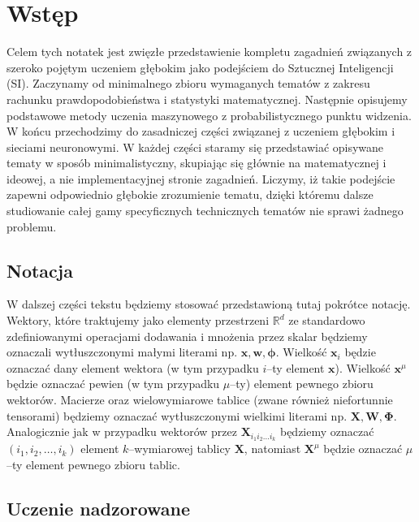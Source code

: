 \documentclass{myclass}
\numberwithin{equation}{section}
\begin{document}
\tableofcontents
\newpage

\section{Wstęp}

Celem tych notatek jest zwięzłe przedstawienie kompletu zagadnień związanych z szeroko pojętym
uczeniem głębokim jako podejściem do Sztucznej Inteligencji (SI). Zaczynamy od minimalnego zbioru
wymaganych tematów z zakresu rachunku prawdopodobieństwa i statystyki matematycznej. Następnie
opisujemy podstawowe metody uczenia maszynowego z probabilistycznego punktu widzenia. W końcu
przechodzimy do zasadniczej części związanej z uczeniem głębokim i sieciami neuronowymi. W każdej
części staramy się przedstawiać opisywane tematy w sposób minimalistyczny, skupiając się głównie na
matematycznej i ideowej, a nie implementacyjnej stronie zagadnień. Liczymy, iż takie podejście
zapewni odpowiednio głębokie zrozumienie tematu, dzięki któremu dalsze studiowanie całej gamy
specyficznych technicznych tematów nie sprawi żadnego problemu.


\subsection{Notacja}

W dalszej części tekstu będziemy stosować przedstawioną tutaj pokrótce notację. Wektory, które
traktujemy jako elementy przestrzeni \(\mathbb{R}^d\) ze standardowo zdefiniowanymi operacjami
dodawania i mnożenia przez skalar będziemy oznaczali wytłuszczonymi małymi literami np.
\(\mathbf{x}, \mathbf{w}, \boldsymbol{\phi}\). Wielkość \(\mathbf{x}_i\) będzie oznaczać dany
element wektora (w tym przypadku \(i\)--ty element \(\mathbf{x}\)). Wielkość \(\mathbf{x}^\mu\)
będzie oznaczać pewien (w tym przypadku \(\mu\)--ty) element pewnego zbioru wektorów. Macierze oraz
wielowymiarowe tablice (zwane również niefortunnie tensorami) będziemy oznaczać wytłuszczonymi
wielkimi literami np. \(\mathbf{X}, \mathbf{W}, \boldsymbol{\Phi}\). Analogicznie jak w przypadku
wektorów przez \(\mathbf{X}_{i_1 i_2 \ldots i_k}\) będziemy oznaczać \((i_1,i_2,\ldots,i_k)\)
element \(k\)--wymiarowej tablicy \(\mathbf{X}\), natomiast \(\mathbf{X}^\mu\) będzie oznaczać
\(\mu\)--ty element pewnego zbioru tablic.


\subsection{Uczenie nadzorowane}
\end{document}
